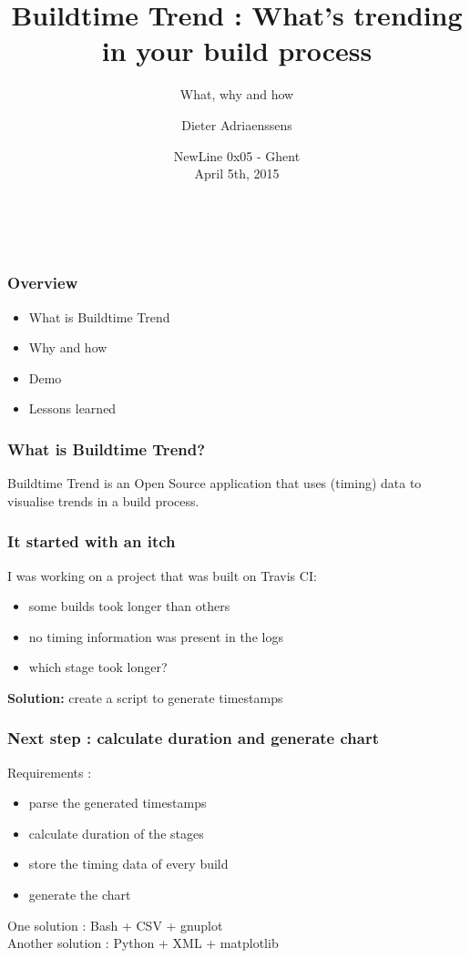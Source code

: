 \documentclass[14pt]{beamer}
\title[Buildtime Trend : What, why and how]{Buildtime Trend : What's trending in your build process}
\subtitle{What, why and how}
\author{Dieter Adriaenssens}
\institute[]{Buildtime Trend founder \& developer - @dcadriaenssens}
\date[NewLine 0x05 5Apr2015]{NewLine 0x05 - Ghent\\
April 5th, 2015}
\begin{document}
  \begin{frame}
    \titlepage
    \vfill
    \begin{center}
      \\[2.5ex]
        {\tiny\CcNote{\CcLongnameByNcSa}}
        \vspace*{-2.5ex}
    \end{center}
  \end{frame}
  \begin{frame}
    \frametitle{Overview}
    \begin{itemize}
      \item What is Buildtime Trend
      \item Why and how
      \item Demo
      \item Lessons learned
    \end{itemize}
  \end{frame}
  \begin{frame}
    \frametitle{What is Buildtime Trend?}
    Buildtime Trend is an Open Source application that uses (timing) data to visualise trends in a build process.
  \end{frame}
  \begin{frame}
    \frametitle{It started with an itch}
    I was working on a project that was built on Travis CI:
    \begin{itemize}
      \item some builds took longer than others
      \item no timing information was present in the logs
      \item which stage took longer?
    \end{itemize}
    \pause
    \textbf{Solution:} create a script to generate timestamps
  \end{frame}
  \begin{frame}
    \frametitle{Next step : calculate duration and generate chart}
    Requirements :
    \begin{itemize}
      \item parse the generated timestamps
      \item calculate duration of the stages
      \item store the timing data of every build
      \item generate the chart
    \end{itemize}
    \pause
    One solution : Bash + CSV + gnuplot\\
    \pause
    Another solution : Python + XML + matplotlib
  \end{frame}
\end{document}
